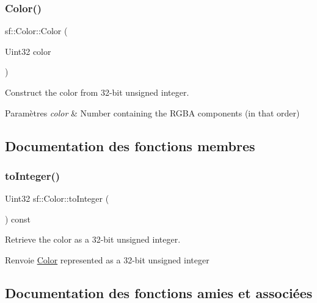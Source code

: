 \subsubsection{\texorpdfstring{Color()}{Color()}\hspace{0.1cm}{\footnotesize\ttfamily [3/3]}}
{\footnotesize\ttfamily sf\+::\+Color\+::\+Color (\begin{DoxyParamCaption}\item[{Uint32}]{color }\end{DoxyParamCaption})\hspace{0.3cm}{\ttfamily [explicit]}}



Construct the color from 32-\/bit unsigned integer. 


\begin{DoxyParams}{Paramètres}
{\em color} & Number containing the R\+G\+BA components (in that order) \\
\hline
\end{DoxyParams}


\subsection{Documentation des fonctions membres}
\mbox{\label{classsf_1_1Color_abb46e6942c4fe0d221574a46e642caa9}} 
\subsubsection{\texorpdfstring{to\+Integer()}{toInteger()}}
{\footnotesize\ttfamily Uint32 sf\+::\+Color\+::to\+Integer (\begin{DoxyParamCaption}{ }\end{DoxyParamCaption}) const}



Retrieve the color as a 32-\/bit unsigned integer. 

\begin{DoxyReturn}{Renvoie}
\hyperlink{classsf_1_1Color}{Color} represented as a 32-\/bit unsigned integer 
\end{DoxyReturn}


\subsection{Documentation des fonctions amies et associées}
\mbox{\label{classsf_1_1Color_a5d6501b7dd05f481b79f7163899f1d92}} 
